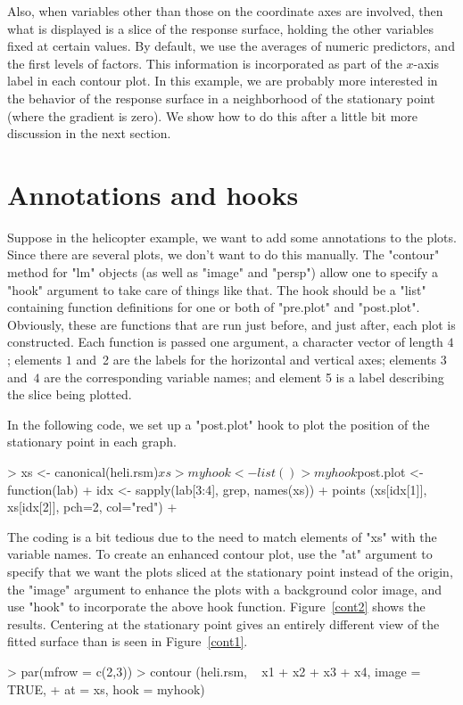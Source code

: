 \documentclass[article,nojss]{jss}
\begin{document}
Also, when variables other than those on the coordinate axes are involved, then what is displayed is a slice of the response surface, holding the other variables fixed at certain values.  By default, we use the averages of numeric predictors, and the first levels of factors.  This information is incorporated as part of the $x$-axis label in each contour plot.
\def\xbar{\bar{x}}
In this example, we are probably more interested in the behavior of the response surface in a neighborhood of the stationary point (where the gradient is zero).  We show how to do this after a little bit more discussion in the next section.


\section{Annotations and hooks}
Suppose in the helicopter example, we want to add some annotations to the plots.  Since there are several plots, we don't want to do this manually.  The "contour" method for "lm" objects (as well as "image" and "persp") allow one to specify a "hook" argument to take care of things like that.  The hook should be a "list" containing function definitions for one or both of "pre.plot" and "post.plot".  Obviously, these are functions that are run just before, and just after, each plot is constructed.  Each function is passed one argument, a character vector of length $4$; elements $1$ and~2 are the labels for the horizontal and vertical axes; elements $3$ and~$4$ are the corresponding variable names; and element 5 is a label describing the slice being plotted.

In the following code, we set up a "post.plot" hook to plot the position of the stationary point in each graph.
\begin{Schunk}
\begin{Sinput}
> xs <- canonical(heli.rsm)$xs
> myhook <- list()
> myhook$post.plot <- function(lab) {
+   idx <- sapply(lab[3:4], grep, names(xs))
+   points (xs[idx[1]], xs[idx[2]], pch=2, col="red")
+ }
\end{Sinput}
\end{Schunk}
The coding is a bit tedious due to the need to match elements of "xs" with the variable names.  
To create an enhanced contour plot, use the "at" argument to specify that we want the plots sliced at the stationary point instead of the origin, the "image" argument to enhance the plots with a background color image, and use "hook" to incorporate the above hook function.  
Figure~\ref{cont2} shows the results.
Centering at the stationary point gives an entirely different view of the fitted surface than is seen in Figure~\ref{cont1}.
\begin{Schunk}
\begin{Sinput}
> par(mfrow = c(2,3))
> contour (heli.rsm, ~ x1 + x2 + x3 + x4, image = TRUE,
+   at = xs, hook = myhook)
\end{Sinput}
\end{Schunk}
\end{document}
